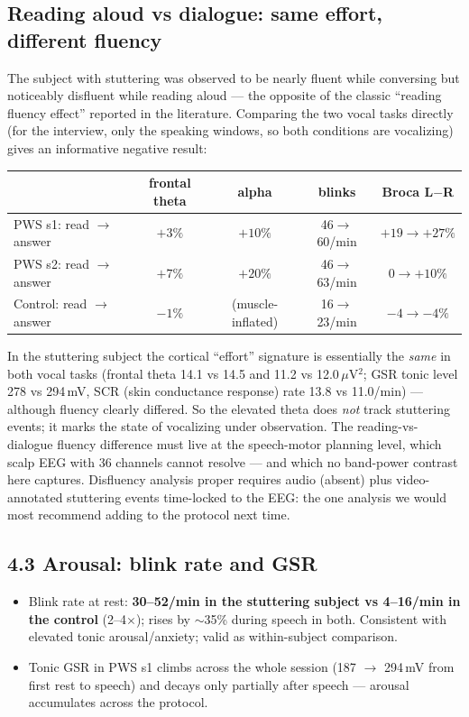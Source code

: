 \documentclass[11pt,a4paper]{article}
\begin{document}
\subsection*{Reading aloud vs dialogue: same effort, different fluency}
The subject with stuttering was observed to be nearly fluent while conversing but noticeably
disfluent while reading aloud --- the opposite of the classic ``reading fluency effect'' reported in
the literature. Comparing the two vocal tasks directly (for the interview, only the speaking
windows, so both conditions are vocalizing) gives an informative negative result:
\begin{center}\small
\begin{tabular}{@{}lcccc@{}}
\toprule
& frontal theta & alpha & blinks & Broca L$-$R \\
\midrule
PWS s1: read $\to$ answer & $+3\%$ & $+10\%$ & 46$\to$60/min & $+19\to+27\%$ \\
PWS s2: read $\to$ answer & $+7\%$ & $+20\%$ & 46$\to$63/min & $0\to+10\%$ \\
Control: read $\to$ answer & $-1\%$ & (muscle-inflated) & 16$\to$23/min & $-4\to-4\%$ \\
\bottomrule
\end{tabular}
\end{center}
In the stuttering subject the cortical ``effort'' signature is essentially the \emph{same} in both
vocal tasks (frontal theta 14.1 vs 14.5 and 11.2 vs 12.0\,$\mu$V$^2$; GSR tonic level 278 vs 294\,mV,
SCR (skin conductance response) rate 13.8 vs 11.0/min) --- although fluency clearly differed. So the elevated theta does
\emph{not} track stuttering events; it marks the state of vocalizing under observation. The
reading-vs-dialogue fluency difference must live at the speech-motor planning level, which scalp EEG
with 36 channels cannot resolve --- and which no band-power contrast here captures. Disfluency
analysis proper requires audio (absent) plus video-annotated stuttering events time-locked to the
EEG: the one analysis we would most recommend adding to the protocol next time.

\subsection*{4.3 Arousal: blink rate and GSR}
\begin{itemize}\setlength\itemsep{1pt}
\item Blink rate at rest: \textbf{30--52/min in the stuttering subject vs 4--16/min in the control}
(2--4$\times$); rises by $\sim$35\% during speech in both. Consistent with elevated tonic
arousal/anxiety; valid as within-subject comparison.
\item Tonic GSR in PWS s1 climbs across the whole session (187 $\rightarrow$ 294\,mV from first rest
to speech) and decays only partially after speech --- arousal accumulates across the protocol.
\end{itemize}
\end{document}
